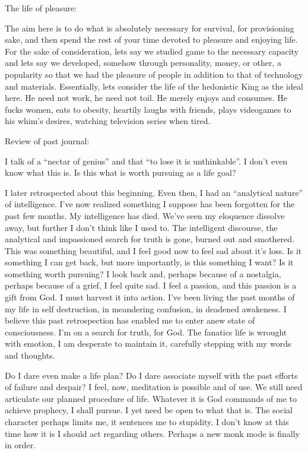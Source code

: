 The life of pleasure:

The aim here is to do what is absolutely necessary for survival, for
provisioning sake, and then spend the rest of your time devoted to
pleasure and enjoying life. For the sake of consideration, lets say we
studied game to the necessary capacity and lets say we developed,
somehow through personality, money, or other, a popularity so that we
had the pleasure of people in addition to that of technology and
materials. Essentially, lets consider the life of the hedonistic King as
the ideal here. He need not work, he need not toil. He merely enjoys and
consumes. He fucks women, eats to obesity, heartily laughs with friends,
plays videogames to his whim's desires, watching television series when
tired.

Review of past journal:

I talk of a ``nectar of genius'' and that ``to lose it is unthinkable''.
I don't even know what this is. Is this what is worth pursuing as a life
goal?

I later retrospected about this beginning. Even then, I had an
``analytical nature'' of intelligence. I've now realized something I
suppose has been forgotten for the past few months. My intelligence has
died. We've seen my eloquence dissolve away, but further I don't think
like I used to. The intelligent discourse, the analytical and
impassioned search for truth is gone, burned out and smothered. This was
something beautiful, and I feel good now to feel sad about it's loss. Is
it something I can get back, but more importantly, is this something I
want? Is it something worth pursuing? I look back and, perhaps because
of a nostalgia, perhaps because of a grief, I feel quite sad. I feel a
passion, and this passion is a gift from God. I must harvest it into
action. I've been living the past months of my life in self destruction,
in meandering confusion, in deadened awakeness. I believe this past
retrospection has enabled me to enter anew state of consciousness. I'm
on a search for truth, for God. The fanatics life is wrought with
emotion, I am desperate to maintain it, carefully stepping with my words
and thoughts.

Do I dare even make a life plan? Do I dare associate myself with the
past efforts of failure and despair? I feel, now, meditation is possible
and of use. We still need articulate our planned procedure of life.
Whatever it is God commands of me to achieve prophecy, I shall pursue. I
yet need be open to what that is. The social character perhaps limits
me, it sentences me to stupidity. I don't know at this time how it is I
should act regarding others. Perhaps a new monk mode is finally in
order.

